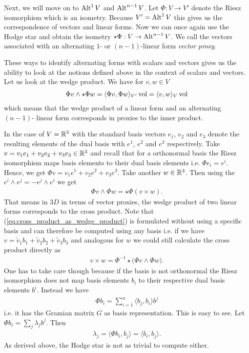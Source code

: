\documentclass[../master_thesis.tex]{subfiles}
\begin{document}
Next, we will move on to ${\text{Alt}^{1}\,V}$ and ${\text{Alt}^{n-1}\,V}$. 
Let $\Phi: V \rightarrow V'$ denote the Riesz isomorphism which is an isometry.
Because $V' = {\text{Alt}^{1}\,V}$ this gives us the correspondence of 
vectors and linear forms. Now we can once again use the Hodge star and obtain 
the isometry $\star \Phi: V \rightarrow {\text{Alt}^{n-1}\,V}$. We call 
the vectors associated with an alternating $1$- or $(n-1)$-linear form 
\textit{vector proxy}.

These ways to identify alternating forms with scalars and vectors gives us the 
ability to look at the notions defined above in the context of scalars 
and vectors.
Let us look at the wedge product. We have for $v,w \in V$
\begin{align*}
    \Phi v \wedge \star \Phi w = \langle \Phi v , \Phi w \rangle_{V'} \operatorname{vol}
    = \langle v , w \rangle_{V} \operatorname{vol}
\end{align*}
which means that the wedge product of a linear form and an alternating $(n-1)$-
linear form corresponds in proxies to the inner product.

In the case of $V= \mathbb{R}^3$ with the standard basis
vectors $e_1$, $e_2$ and $e_3$ denote the resulting elements 
of the dual basis with $e^1$, $e^2$ and $e^3$ respectively. 
Take $v = v_1 e_1 + v_2 e_2 + v_3 e_3 \in \mathbb{R}^3$ 
and recall that for a orthonormal basis the Riesz isomorphism maps basis 
elements to their dual basis elements i.e. $\Phi e_i = e^i$. Hence, 
we get $\Phi v = v_1 e^1 + v_2 e^2 + v_3 e^3$. Take another $w \in \mathbb{R}^3$.
Then using the $e^i \wedge e^j = - e^j \wedge e^i$ we get 
\begin{align}
    \Phi v \wedge \Phi w = \star \Phi (v \times w). 
    \label{eq:cross_product_as_wedge_product}
\end{align}
That means in $3D$ in terms of vector proxies, the wedge product 
of two linear forms corresponds to the cross product. Note that 
(\ref{eq:cross_product_as_wedge_product}) is formulated without using a 
specific basis and can therefore be computed using any basis i.e. 
if we have $v = \tilde{v}_1 b_1 + \tilde{v}_2 b_2 + \tilde{v}_3 b_3$ 
and analogous for $w$ we could still calculate the cross product directly as 
\begin{align*}
    v \times w = \Phi^{-1} \star \big(\Phi v \wedge \Phi w \big).
\end{align*}
One has to take care though because if the basis is not orthonormal 
the Riesz isomorphism does not map basis elements $b_i$ to their respective 
dual basis elements $b^i$. Instead we have 
\begin{align*}
    \Phi b_i = \sum_{i=1}^{n} \langle b_j, b_i \rangle b^j
\end{align*}
i.e. it has the Gramian matrix $G$ as basis representation. 
This is easy to 
see. Let $\Phi b_i = \sum_j \lambda_j b^j$. Then
\begin{align*}
    \lambda_j = \langle \Phi b_i ,b_j \rangle = \langle b_i, b_j \rangle.
\end{align*}
As derived above, the Hodge star is not as trivial to compute either.
\end{document}
